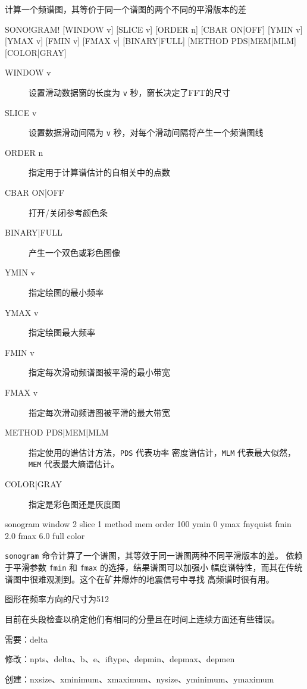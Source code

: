 \label{cmd:sonogram}

计算一个频谱图，其等价于同一个谱图的两个不同的平滑版本的差

\begin{SACSTX}
SONO!GRAM! [WINDOW v] [SLICE v] [ORDER n] [CBAR ON|OFF]
    [YMIN v] [YMAX v] [FMIN v] [FMAX v] [BINARY|FULL]
    [METHOD PDS|MEM|MLM] [COLOR|GRAY]
\end{SACSTX}

\begin{description}
\item [WINDOW v] 设置滑动数据窗的长度为 \texttt{v} 秒，窗长决定了FFT的尺寸
\item [SLICE v] 设置数据滑动间隔为 \texttt{v} 秒，对每个滑动间隔将产生一个频谱图线
\item [ORDER n] 指定用于计算谱估计的自相关中的点数
\item [CBAR ON|OFF] 打开/关闭参考颜色条
\item [BINARY|FULL] 产生一个双色或彩色图像
\item [YMIN v] 指定绘图的最小频率
\item [YMAX v] 指定绘图最大频率
\item [FMIN v] 指定每次滑动频谱图被平滑的最小带宽
\item [FMAX v] 指定每次滑动频谱图被平滑的最大带宽
\item [METHOD PDS|MEM|MLM] 指定使用的谱估计方法，\texttt{PDS} 代表功率
    密度谱估计，\texttt{MLM} 代表最大似然，\texttt{MEM} 代表最大熵谱估计。
\item [COLOR|GRAY] 指定是彩色图还是灰度图
\end{description}

\begin{SACDFT}
sonogram window 2 slice 1 method mem order 100 ymin 0 ymax
    fnyquist fmin 2.0 fmax 6.0 full color
\end{SACDFT}

\texttt{sonogram} 命令计算了一个谱图，其等效于同一谱图两种不同平滑版本的差。
依赖于平滑参数 \texttt{fmin} 和 \texttt{fmax} 的选择，结果谱图可以加强小
幅度谱特性，而其在传统谱图中很难观测到。这个在矿井爆炸的地震信号中寻找
高频谱时很有用。

图形在频率方向的尺寸为512

目前在头段检查以确定他们有相同的分量且在时间上连续方面还有些错误。

需要：delta

修改：npts、delta、b、e、iftype、depmin、depmax、depmen

创建：nxsize、xminimum、xmaximum、nysize、yminimum、ymaximum
